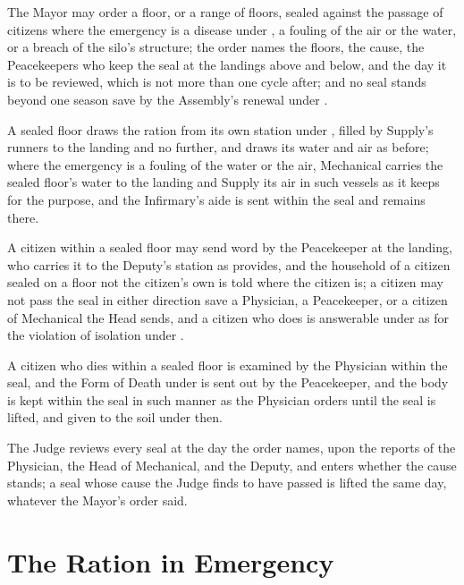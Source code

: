 \begin{clauses}
\item The Mayor may order a floor, or a range of floors, sealed against the passage of citizens where the emergency is a disease under , a fouling of the air or the water, or a breach of the silo's structure; the order names the floors, the cause, the Peacekeepers who keep the seal at the landings above and below, and the day it is to be reviewed, which is not more than one cycle after; and no seal stands beyond one season save by the Assembly's renewal under .
\item A sealed floor draws the ration from its own station under , filled by Supply's runners to the landing and no further, and draws its water and air as before; where the emergency is a fouling of the water or the air, Mechanical carries the sealed floor's water to the landing and Supply its air in such vessels as it keeps for the purpose, and the Infirmary's aide is sent within the seal and remains there.
\item A citizen within a sealed floor may send word by the Peacekeeper at the landing, who carries it to the Deputy's station as  provides, and the household of a citizen sealed on a floor not the citizen's own is told where the citizen is; a citizen may not pass the seal in either direction save a Physician, a Peacekeeper, or a citizen of Mechanical the Head sends, and a citizen who does is answerable under  as for the violation of isolation under .
\item A citizen who dies within a sealed floor is examined by the Physician within the seal, and the Form of Death under  is sent out by the Peacekeeper, and the body is kept within the seal in such manner as the Physician orders until the seal is lifted, and given to the soil under  then.
\item The Judge reviews every seal at the day the order names, upon the reports of the Physician, the Head of Mechanical, and the Deputy, and enters whether the cause stands; a seal whose cause the Judge finds to have passed is lifted the same day, whatever the Mayor's order said.
\end{clauses}

\section{The Ration in Emergency}
\label{sec:emergency:ration-in-emergency}

